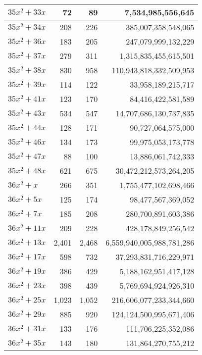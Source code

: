 \documentclass[a4paper]{amsproc}
\theoremstyle{plain}
\theoremstyle{named}
\begin{document}
\begin{longtable}{ | l | r | r | r | }
$35x^2 + 33x$ & 72 & 89 & 7{,}534{,}985{,}556{,}645 \\ \hline
$35x^2 + 34x$ & 208 & 226 & 385{,}007{,}358{,}548{,}065 \\ \hline
$35x^2 + 36x$ & 183 & 205 & 247{,}079{,}999{,}132{,}229 \\ \hline
$35x^2 + 37x$ & 279 & 311 & 1{,}315{,}835{,}455{,}615{,}501 \\ \hline
$35x^2 + 38x$ & 830 & 958 & 110{,}943{,}818{,}332{,}509{,}953 \\ \hline
$35x^2 + 39x$ & 114 & 122 & 33{,}958{,}189{,}215{,}717 \\ \hline
$35x^2 + 41x$ & 123 & 170 & 84{,}416{,}422{,}581{,}589 \\ \hline
$35x^2 + 43x$ & 534 & 547 & 14{,}707{,}686{,}130{,}737{,}835 \\ \hline
$35x^2 + 44x$ & 128 & 171 & 90{,}727{,}064{,}575{,}000 \\ \hline
$35x^2 + 46x$ & 134 & 173 & 99{,}975{,}053{,}173{,}778 \\ \hline
$35x^2 + 47x$ & 88 & 100 & 13{,}886{,}061{,}742{,}333 \\ \hline
$35x^2 + 48x$ & 621 & 675 & 30{,}472{,}212{,}573{,}264{,}205 \\ \hline
$36x^2 + x$ & 266 & 351 & 1{,}755{,}477{,}102{,}698{,}466 \\ \hline
$36x^2 + 5x$ & 125 & 174 & 98{,}477{,}567{,}369{,}052 \\ \hline
$36x^2 + 7x$ & 185 & 208 & 280{,}700{,}891{,}603{,}386 \\ \hline
$36x^2 + 11x$ & 209 & 228 & 428{,}178{,}849{,}256{,}542 \\ \hline
$36x^2 + 13x$ & 2{,}401 & 2{,}468 & 6{,}559{,}940{,}005{,}988{,}781{,}286 \\ \hline
$36x^2 + 17x$ & 598 & 732 & 37{,}293{,}831{,}716{,}229{,}971 \\ \hline
$36x^2 + 19x$ & 386 & 429 & 5{,}188{,}162{,}951{,}417{,}128 \\ \hline
$36x^2 + 23x$ & 398 & 439 & 5{,}769{,}694{,}924{,}926{,}310 \\ \hline
$36x^2 + 25x$ & 1{,}023 & 1{,}052 & 216{,}606{,}077{,}233{,}344{,}660 \\ \hline
$36x^2 + 29x$ & 885 & 920 & 124{,}124{,}500{,}995{,}671{,}406 \\ \hline
$36x^2 + 31x$ & 133 & 176 & 111{,}706{,}225{,}352{,}086 \\ \hline
$36x^2 + 35x$ & 143 & 180 & 131{,}864{,}270{,}755{,}212 \\ \hline

\end{longtable}
\end{document}
